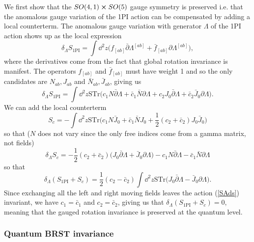 \documentclass[12pt]{article}
\def\be{\begin{equation}}
\def\ee{\end{equation}}
\numberwithin{equation}{section}
\begin{document}
We first show that the $SO(4,1) \cross SO(5)$ gauge symmetry is preserved i.e. that the anomalous gauge variation of the 1PI action can be compensated by adding a local counterterm. The anomalous gauge variation with generator $\Lambda$ of the 1PI action shows up as the local expression
\be
\delta_\Lambda S_{\text{1PI}} = \int \dd^2 z \big(f_{[ab]} \bar{\partial} \Lambda^{[ab]} + \bar{f}_{[ab]} \partial \Lambda^{[ab]}\big),
\ee
where the derivatives come from the fact that global rotation invariance is manifest. The operators $f_{[ab]}$ and $\bar{f}_{[ab]}$ must have weight 1 and so the only candidates are $N_{ab}, J_{ab}$ and $\bar{N}_{ab}, \bar{J}_{ab}$, giving us
\be
\delta_\Lambda S_{\text{1PI}} = \int \dd^2z \text{STr}\big(c_1 N \bar{\partial}\Lambda + \bar{c}_1 \bar{N}\partial\Lambda + c_2 J_0 \bar{\partial} \Lambda + \bar{c}_2 \bar{J}_0 \partial \Lambda\big).
\ee
We can add the local counterterm
\be
S_c = -\int \dd^2 z \text{STr}\big(c_1 N \bar{J}_0 + \bar{c}_1 \bar{N} J_0 + \frac{1}{2} (c_2 + \bar{c}_2) J_0 \bar{J}_0\big)
\ee
so that ($N$ does not vary since the only free indices come from a gamma matrix, not fields)
\be
\delta_\Lambda S_c = -\frac{1}{2}(c_2 + \bar{c}_2) \big(J_0 \bar{\partial} \Lambda + \bar{J}_0 \partial \Lambda\big) - c_1 N \bar{\partial} \Lambda - \bar{c}_1 \bar{N} \partial \Lambda
\ee
so that
\be
\delta_\Lambda(S_{\text{1PI}} + S_c) =\frac{1}{2}(c_2 - \bar{c}_2) \int \dd^2z \text{STr}\big(J_0 \bar{\partial} \Lambda - \bar{J}_0 \partial \Lambda\big).
\ee
Since exchanging all the left and right moving fields leaves the action (\ref{SAds}) invariant, we have $c_1 = \bar{c}_1$ and $c_2 = \bar{c}_2$, giving us that $\delta_\Lambda(S_{\text{1PI}} + S_c) = 0$, meaning that the gauged rotation invariance is preserved at the quantum level.


\subsubsection{Quantum BRST invariance}
\label{quantumBRST}
\end{document}
